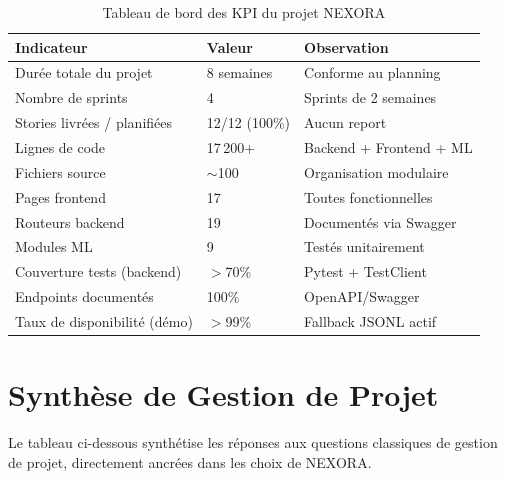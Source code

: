 \documentclass[12pt,a4paper]{report}
\begin{document}
\begin{table}[H]
\centering
\caption{Tableau de bord des KPI du projet NEXORA}
\label{tab:kpi}
\begin{tabular}{p{6cm} p{3cm} p{5cm}}
\toprule
\textbf{Indicateur} & \textbf{Valeur} & \textbf{Observation} \\
\midrule
Durée totale du projet       & 8 semaines    & Conforme au planning \\
Nombre de sprints            & 4             & Sprints de 2 semaines \\
Stories livrées / planifiées & 12/12 (100\%) & Aucun report \\
Lignes de code               & 17\,200+      & Backend + Frontend + ML \\
Fichiers source              & $\sim$100     & Organisation modulaire \\
Pages frontend               & 17            & Toutes fonctionnelles \\
Routeurs backend             & 19            & Documentés via Swagger \\
Modules ML                   & 9             & Testés unitairement \\
Couverture tests (backend)   & $>$70\%       & Pytest + TestClient \\
Endpoints documentés         & 100\%         & OpenAPI/Swagger \\
Taux de disponibilité (démo) & $>$99\%       & Fallback JSONL actif \\
\bottomrule
\end{tabular}
\end{table}

\section{Synthèse de Gestion de Projet}
Le tableau ci-dessous synthétise les réponses aux questions classiques de gestion de projet, directement ancrées dans les choix de NEXORA.
\end{document}
